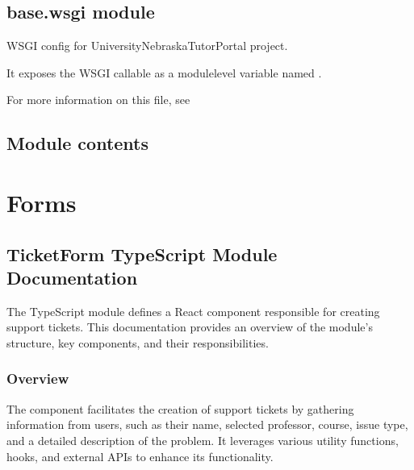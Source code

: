 \documentclass[letterpaper,10pt,english]{sphinxmanual}
\begin{document}
\section{base.wsgi module}
\label{\detokenize{settings/settings:module-base.wsgi}}\label{\detokenize{settings/settings:base-wsgi-module}}
\sphinxAtStartPar
WSGI config for University\sphinxhyphen{}Nebraska\sphinxhyphen{}Tutor\sphinxhyphen{}Portal project.

\sphinxAtStartPar
It exposes the WSGI callable as a module\sphinxhyphen{}level variable named .

\sphinxAtStartPar
For more information on this file, see


\section{Module contents}
\label{\detokenize{settings/settings:module-base}}\label{\detokenize{settings/settings:module-contents}}
\sphinxstepscope

\sphinxstepscope

\sphinxstepscope


\chapter{Forms}
\label{\detokenize{forms/index:forms}}\label{\detokenize{forms/index::doc}}
\sphinxstepscope


\section{TicketForm TypeScript Module Documentation}
\label{\detokenize{forms/ticket:ticketform-typescript-module-documentation}}\label{\detokenize{forms/ticket::doc}}
\sphinxAtStartPar
The  TypeScript module defines a React component responsible for creating support tickets. This documentation provides an overview of the module’s structure, key components, and their responsibilities.


\subsection{Overview}
\label{\detokenize{forms/ticket:overview}}
\sphinxAtStartPar
The  component facilitates the creation of support tickets by gathering information from users, such as their name, selected professor, course, issue type, and a detailed description of the problem. It leverages various utility functions, hooks, and external APIs to enhance its functionality.
\end{document}
